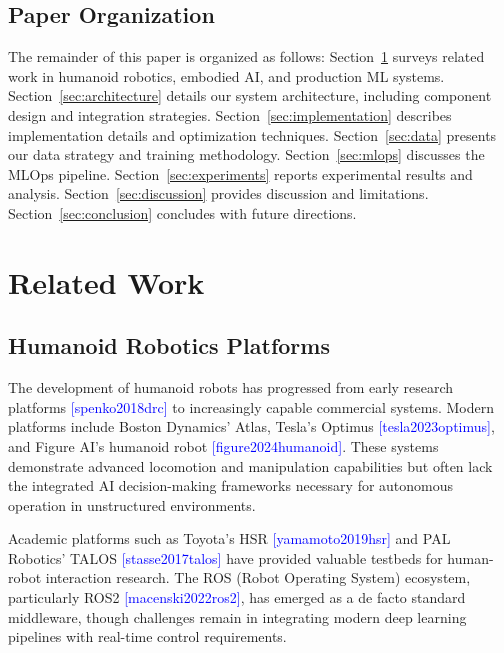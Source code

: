 \documentclass[conference]{IEEEtran}
\newcommand{\cite}[1]{\textcolor{blue}{[#1]}}
\begin{document}
\subsection{Paper Organization}

The remainder of this paper is organized as follows: Section~\ref{sec:related} surveys related work in humanoid robotics, embodied AI, and production ML systems. Section~\ref{sec:architecture} details our system architecture, including component design and integration strategies. Section~\ref{sec:implementation} describes implementation details and optimization techniques. Section~\ref{sec:data} presents our data strategy and training methodology. Section~\ref{sec:mlops} discusses the MLOps pipeline. Section~\ref{sec:experiments} reports experimental results and analysis. Section~\ref{sec:discussion} provides discussion and limitations. Section~\ref{sec:conclusion} concludes with future directions.

\section{Related Work}
\label{sec:related}

\subsection{Humanoid Robotics Platforms}

The development of humanoid robots has progressed from early research platforms \cite{spenko2018drc} to increasingly capable commercial systems. Modern platforms include Boston Dynamics' Atlas, Tesla's Optimus \cite{tesla2023optimus}, and Figure AI's humanoid robot \cite{figure2024humanoid}. These systems demonstrate advanced locomotion and manipulation capabilities but often lack the integrated AI decision-making frameworks necessary for autonomous operation in unstructured environments.

Academic platforms such as Toyota's HSR \cite{yamamoto2019hsr} and PAL Robotics' TALOS \cite{stasse2017talos} have provided valuable testbeds for human-robot interaction research. The ROS (Robot Operating System) ecosystem, particularly ROS2 \cite{macenski2022ros2}, has emerged as a de facto standard middleware, though challenges remain in integrating modern deep learning pipelines with real-time control requirements.
\end{document}
